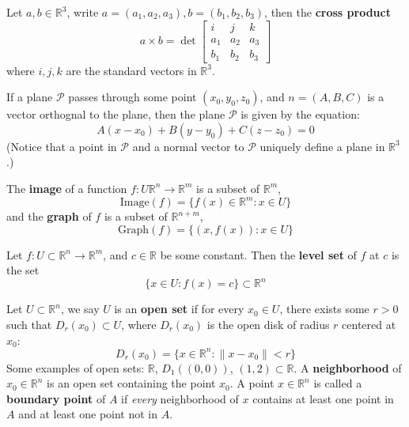 \documentclass[openany]{book}
\newcommand{\R}{\mathbb{R}}
\begin{document}
\begin{defn}
    Let $a,b\in\R^3$, write $a=(a_1,a_2,a_3), b=(b_1,b_2,b_3)$, then the \textbf{cross product}
    \begin{equation*}
        a\times b=\det\begin{bmatrix}
            i&j&k\\
            a_1&a_2&a_3\\
            b_1&b_2&b_3
        \end{bmatrix}
    \end{equation*}
    where $i,j,k$ are the standard vectors in $\R^3$.
\end{defn}

\begin{defn}[Plane in $\R^3$]\label{plane}
   If a plane $\mathcal{P}$ passes through some point $(x_0,y_0,z_0)$, and $n=(A,B,C)$ is a vector orthognal to the plane, then the plane $\mathcal{P}$ is given by the equation:
    \begin{equation*}
        A(x-x_0)+B(y-y_0)+C(z-z_0)=0
    \end{equation*}
    (Notice that a point in $\mathcal{P}$ and a normal vector to $\mathcal{P}$ uniquely define a plane in $\R^3$.)
\end{defn}


\begin{defn}
    The \textbf{image} of a function $f: U\R^n\to\R^m$ is a subset of $\R^m$,
    \begin{equation*}
        \text{Image}(f)=\{f(x)\in\R^m: x\in U\}
    \end{equation*}
    and the \textbf{graph} of $f$ is a subset of $\R^{n+m}$,
    \begin{equation*}
        \text{Graph}(f)=\{(x,f(x)): x\in U\}
    \end{equation*}
\end{defn}


\begin{defn}
    Let $f:U\subset\R^n\to\R^m$, and $c\in\R$ be some constant. Then the \textbf{level set} of $f$ at $c$ is the set 
    \begin{equation*}
        \{x\in U: f(x)=c\}\subset\R^n
    \end{equation*}
\end{defn}

\begin{defn}
    Let $U\subset\R^n$, we say $U$ is an \textbf{open set} if for every $x_0\in U$, there exists some $r>0$ such that $D_r(x_0)\subset U$, where $D_r(x_0)$ is the open disk of radius $r$ centered at $x_0$:
    \begin{equation*}
        D_r(x_0)=\{x\in\R^n: \|x-x_0\|<r\}
    \end{equation*}
    Some examples of open sets: $\R$, $D_{1}((0,0))$, $(1,2)\subset\R$.
    A \textbf{neighborhood} of $x_0\in\R^n$ is an open set containing the point $x_0$. A point $x\in\R^n$ is called a \textbf{boundary point} of $A$ if \textit{every} neighborhood of $x$ contains at least one point in $A$ and at least one point not in $A$.
\end{defn}
\end{document}
